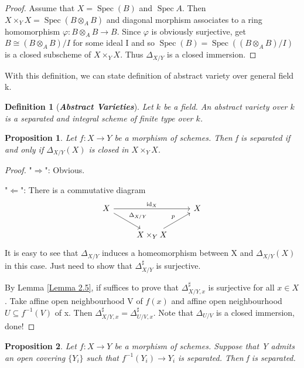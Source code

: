 \documentclass{ctexart}
\newtheorem{definition}{Definition}[section]
\newtheorem{proposition}{Proposition}[section]
\newcommand{\identity}{\operatorname{id}}
\newcommand{\spec}{\operatorname{Spec}}
\begin{document}
\begin{proof}
    Assume that $X = \spec(B)$ and $\spec A$.
    Then $X \times_{Y} X = \spec(B \otimes_{A} B)$ and diagonal morphism associates to a ring homomorphism $\varphi: B \otimes_{A} B \longrightarrow B$.
    Since $\varphi$ is obviously surjective, get $B \cong (B \otimes_{A} B)/I$ for some ideal I and so $\spec(B) = \spec((B \otimes_{A} B)/I)$ is a closed subscheme of $X \times_{Y} X$.
    Thus $\Delta_{X/Y}$ is a closed immersion.
\end{proof}
With this definition, we can state definition of abstract variety over general field k.
\begin{definition}[\textbf{\emph{Abstract Varieties}}]
    Let $k$ be a field.
    An abstract variety over $k$ is a separated and integral scheme of finite type over $k$.
\end{definition}
\begin{proposition}
    Let $f: X \longrightarrow Y$ be a morphism of schemes.
    Then f is separated if and only if $\Delta_{X/Y}(X)$ is closed in $X \times_{Y} X$.
    \label{Proposition 4.2}
\end{proposition}
\begin{proof}
    "$\Rightarrow$": Obvious.
    \par
    "$\Leftarrow$": There is a commutative diagram
    \begin{equation*}
        \begin{tikzcd}
            X \arrow[rr, "\identity_{X}"] \arrow[dr, "\Delta_{X/Y}"] &&
            X \\
            & X \times_{Y} X \arrow[ur, "p"] &
        \end{tikzcd}
    \end{equation*}
    It is easy to see that $\Delta_{X/Y}$ induces a homeomorphism between X and $\Delta_{X/Y}(X)$ in this case.
    Just need to show that $\Delta_{X/Y}^{\sharp}$ is surjective.
    \par
    By Lemma \ref{Lemma 2.5}, if suffices to prove that $\Delta_{X/Y, x}^{\sharp}$ is surjective for all $x\in X$.
    Take affine open neighbourhood V of $f(x)$ and affine open neighbourhood $U \subseteq f^{-1}(V)$ of x.
    Then $\Delta_{X/Y, x}^{\sharp} = \Delta_{U/V, x}^{\sharp}$.
    Note that $\Delta_{U/V}$ is a closed immersion, done!
\end{proof}
\begin{proposition}
    Let $f: X \longrightarrow Y$ be a morphism of schemes.
    Suppose that Y admits an open covering $\{Y_{i}\}$ such that $f^{-1}(Y_{i}) \longrightarrow Y_{i}$ is separated.
    Then f is separated.
    \label{Proposition 4.3}
\end{proposition}
\end{document}
